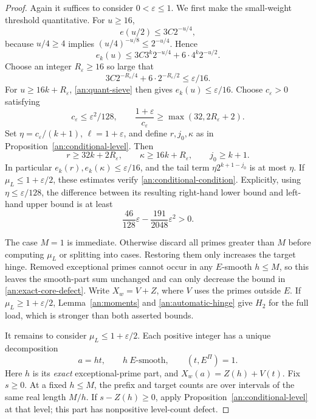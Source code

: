 \begin{proof}
Again it suffices to consider \(0<\varepsilon\le1\). We first make
the small-weight threshold quantitative. For \(u\ge16\),
\[
 e(u/2)\le3C2^{-u/4},
\]
because \(u/4\ge4\) implies
\((u/4)^{-u/8}\le2^{-u/4}\). Hence
\begin{equation}
 e_k(u)\le3C3^k2^{-u/4}+6\cdot4^k2^{-u/2}.
 \label{an:quant-sieve}
\end{equation}
Choose an integer \(R_\varepsilon\ge16\) so large that
\[
 3C2^{-R_\varepsilon/4}+6\cdot2^{-R_\varepsilon/2}
 \le\varepsilon/16.
\]
For \(u\ge16k+R_\varepsilon\), \eqref{an:quant-sieve} then gives
\(e_k(u)\le\varepsilon/16\). Choose \(c_\varepsilon>0\) satisfying
\[
 c_\varepsilon\le\varepsilon^2/128,
 \qquad
 \frac{1+\varepsilon}{c_\varepsilon}
 \ge\max(32,2R_\varepsilon+2).
\]
Set \(\eta=c_\varepsilon/(k+1)\), \(\ell=1+\varepsilon\), and
define \(r,j_0,\kappa\) as in Proposition~\ref{an:conditional-level}.
Then
\[
 r\ge32k+2R_\varepsilon,\qquad
 \kappa\ge16k+R_\varepsilon,\qquad j_0\ge k+1.
\]
In particular \(e_k(r),e_k(\kappa)\le\varepsilon/16\), and the
tail term \(\eta2^{k+1-j_0}\) is at most \(\eta\). If
\(\mu_L\le1+\varepsilon/2\), these estimates verify
\eqref{an:conditional-condition}. Explicitly, using
\(\eta\le\varepsilon/128\), the difference between its resulting
right-hand lower bound and left-hand upper bound is at least
\[
 \frac{46}{128}\varepsilon-\frac{191}{2048}\varepsilon^2>0.
\]

The case \(M=1\) is immediate. Otherwise discard all primes greater
than \(M\) before computing \(\mu_L\) or splitting into cases.
Restoring them only increases the target hinge. Removed exceptional
primes cannot occur in any \(E\)-smooth \(h\le M\), so this leaves
the smooth-part sum unchanged and can only decrease the bound in
\eqref{an:exact-core-defect}. Write
\(X_w=V+Z\), where \(V\) uses the primes outside \(E\).
If \(\mu_L\ge1+\varepsilon/2\), Lemma~\ref{an:moments} and
\eqref{an:automatic-hinge} give \(H_2\) for the full load, which is
stronger than both asserted bounds.

It remains to consider \(\mu_L\le1+\varepsilon/2\). Each positive
integer has a unique decomposition
\[
 a=ht,\qquad h\ E\text{-smooth},\qquad(t,E^{\Pi})=1.
\]
Here \(h\) is its \emph{exact} exceptional-prime part, and
\(X_w(a)=Z(h)+V(t)\). Fix \(s\ge0\). At a fixed \(h\le M\),
the prefix and target counts are over intervals of the same real length
\(M/h\). If \(s-Z(h)\ge0\), apply
Proposition~\ref{an:conditional-level} at that level; this part has
nonpositive level-count defect.


\end{proof}

